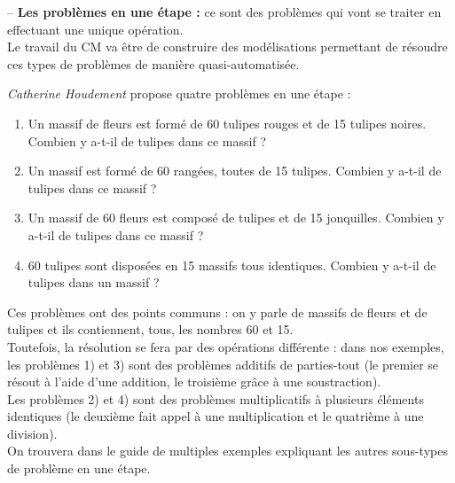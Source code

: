    -- {\bf Les problèmes en une étape :} ce sont des problèmes qui vont se traiter en effectuant une unique opération. \\
   Le travail du CM va être de construire des modélisations permettant de résoudre ces types de problèmes de manière quasi-automatisée.
      \begin{exemple*1}
         {\it Catherine Houdement} propose quatre problèmes en une étape :
         {\small
         \begin{enumerate}
            \item Un massif de fleurs est formé de 60 tulipes rouges et de 15 tulipes noires. Combien y a-t-il de tulipes dans ce massif ?
            \item Un massif est formé de 60 rangées, toutes de 15 tulipes. Combien y a-t-il de tulipes dans ce massif ?
            \item Un massif de 60 fleurs est composé de tulipes et de 15 jonquilles. Combien y a-t-il de tulipes dans ce massif ?
            \item 60 tulipes sont disposées en 15 massifs tous identiques. Combien y a-t-il de tulipes dans un massif ? \\ [-8mm]
         \end{enumerate}}
      \end{exemple*1} \medskip
      Ces problèmes ont des points communs : on y parle de massifs de fleurs et de tulipes et ils contiennent, tous, les nombres 60 et 15. \\
      Toutefois, la résolution se fera par des opérations différente : dans nos exemples, les problèmes 1) et 3) sont des problèmes additifs de parties-tout (le premier se résout à l'aide d'une addition, le troisième grâce à une soustraction). \\
      Les problèmes 2) et 4) sont des problèmes multiplicatifs à plusieurs éléments identiques (le deuxième fait appel à une multiplication et le quatrième à une division). \\
      On trouvera dans le guide de multiples exemples expliquant les autres sous-types de problème en une étape. \\
      
